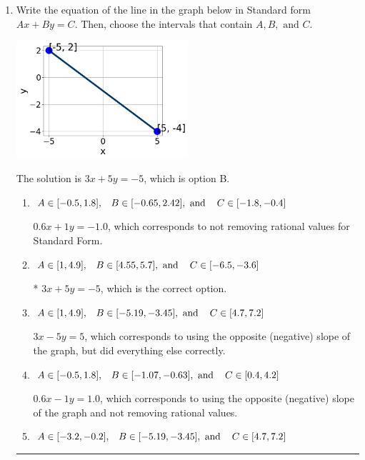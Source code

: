 \documentclass{extbook}[14pt]
\newcommand{\litem}[1]{\item #1

\rule{\textwidth}{0.4pt}}
\begin{document}
\begin{enumerate}\litem{
Write the equation of the line in the graph below in Standard form $Ax+By=C$. Then, choose the intervals that contain $A, B, \text{ and } C$.

\begin{center}
    \includegraphics[width=0.5\textwidth]{../Figures/linearGraphToStandardCopyB.png}
\end{center}




The solution is \( 3x + 5y = -5 \), which is option B.\begin{enumerate}[label=\Alph*.]
\item \( A \in [-0.5, 1.8], \hspace{3mm} B \in [-0.65, 2.42], \text{ and } \hspace{3mm} C \in [-1.8, -0.4] \)

 $0.6x + 1y = -1.0$, which corresponds to not removing rational values for Standard Form.
\item \( A \in [1, 4.9], \hspace{3mm} B \in [4.55, 5.7], \text{ and } \hspace{3mm} C \in [-6.5, -3.6] \)

* $3x + 5y = -5$, which is the correct option.
\item \( A \in [1, 4.9], \hspace{3mm} B \in [-5.19, -3.45], \text{ and } \hspace{3mm} C \in [4.7, 7.2] \)

 $3x - 5y = 5$, which corresponds to using the opposite (negative) slope of the graph, but did everything else correctly.
\item \( A \in [-0.5, 1.8], \hspace{3mm} B \in [-1.07, -0.63], \text{ and } \hspace{3mm} C \in [0.4, 4.2] \)

 $0.6x - 1y = 1.0$, which corresponds to using the opposite (negative) slope of the graph and not removing rational values.
\item \( A \in [-3.2, -0.2], \hspace{3mm} B \in [-5.19, -3.45], \text{ and } \hspace{3mm} C \in [4.7, 7.2] \)


\end{enumerate}}
\end{enumerate}
\end{document}
